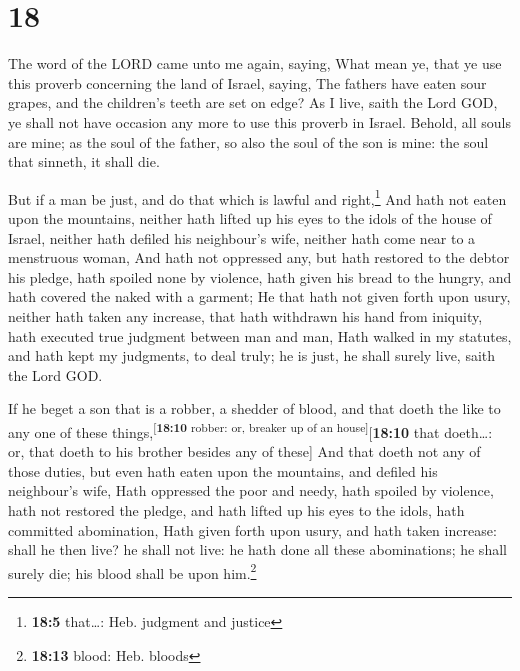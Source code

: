 \hypertarget{section-17}{%
\section{18}\label{section-17}}

 The word of the LORD came unto me again, saying,
 What mean ye, that ye use this proverb concerning the
land of Israel, saying, The fathers have eaten sour grapes, and the
children's teeth are set on edge?  As I live, saith the
Lord GOD, ye shall not have occasion any more to use this proverb in
Israel.  Behold, all souls are mine; as the soul of the
father, so also the soul of the son is mine: the soul that sinneth, it
shall die.

 But if a man be just, and do that which is lawful and
right,\footnote{\textbf{18:5} that\ldots: Heb. judgment and justice}
 And hath not eaten upon the mountains, neither hath
lifted up his eyes to the idols of the house of Israel, neither hath
defiled his neighbour's wife, neither hath come near to a menstruous
woman,  And hath not oppressed any, but hath restored to
the debtor his pledge, hath spoiled none by violence, hath given his
bread to the hungry, and hath covered the naked with a garment;
 He that hath not given forth upon usury, neither hath
taken any increase, that hath withdrawn his hand from iniquity, hath
executed true judgment between man and man,  Hath walked
in my statutes, and hath kept my judgments, to deal truly; he is just,
he shall surely live, saith the Lord GOD.

 If he beget a son that is a robber, a shedder of blood,
and that doeth the like to any one of these
things,\textsuperscript{{[}\textbf{18:10} robber: or, breaker up of an
house{]}}{[}\textbf{18:10} that doeth\ldots: or, that doeth to his
brother besides any of these{]}  And that doeth not any
of those duties, but even hath eaten upon the mountains, and defiled his
neighbour's wife,  Hath oppressed the poor and needy,
hath spoiled by violence, hath not restored the pledge, and hath lifted
up his eyes to the idols, hath committed abomination, 
Hath given forth upon usury, and hath taken increase: shall he then
live? he shall not live: he hath done all these abominations; he shall
surely die; his blood shall be upon him.\footnote{\textbf{18:13} blood:
  Heb. bloods}

